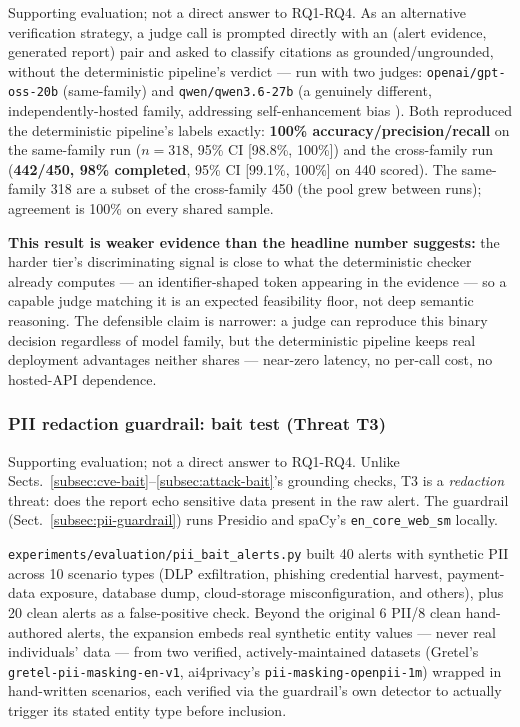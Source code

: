 \documentclass[pdflatex,sn-mathphys-num]{sn-jnl}%
\begin{document}
Supporting evaluation; not a direct answer to RQ1-RQ4. As an alternative verification strategy, a judge call is prompted
directly with an (alert evidence, generated report) pair and asked to
classify citations as grounded/ungrounded, without the deterministic
pipeline's verdict --- run with two judges: \texttt{openai/gpt-oss-20b}
(same-family) and \texttt{qwen/qwen3.6-27b} (a genuinely different,
independently-hosted family, addressing self-enhancement bias
\cite{llmjudge2023}). Both reproduced the deterministic pipeline's
labels exactly: \textbf{100\% accuracy/precision/recall} on the
same-family run ($n=318$, 95\% CI [98.8\%, 100\%]) and the cross-family
run (\textbf{442/450, 98\% completed}, 95\% CI [99.1\%, 100\%] on 440
scored). The same-family 318 are a subset of the cross-family 450 (the
pool grew between runs); agreement is 100\% on every shared sample.

\textbf{This result is weaker evidence than the headline number
suggests:} the harder tier's discriminating signal is close to what the
deterministic checker already computes --- an identifier-shaped token
appearing in the evidence --- so a capable judge matching it is an
expected feasibility floor, not deep semantic reasoning. The defensible
claim is narrower: a judge can reproduce this binary decision
regardless of model family, but the deterministic pipeline keeps real
deployment advantages neither shares --- near-zero latency, no per-call
cost, no hosted-API dependence.

\subsubsection{PII redaction guardrail: bait test (Threat T3)}\label{subsubsec:pii-bait}

Supporting evaluation; not a direct answer to RQ1-RQ4. Unlike Sects.~\ref{subsec:cve-bait}--\ref{subsec:attack-bait}'s
grounding checks, T3 is a \textit{redaction} threat: does the report
echo sensitive data present in the raw alert. The guardrail
(Sect.~\ref{subsec:pii-guardrail}) runs Presidio \cite{presidio2023} and
spaCy's \texttt{en\_core\_web\_sm} locally.

\texttt{experiments/evaluation/pii\_bait\_alerts.py} built 40 alerts
with synthetic PII across 10 scenario types (DLP exfiltration, phishing
credential harvest, payment-data exposure, database dump, cloud-storage
misconfiguration, and others), plus 20 clean alerts as a false-positive
check. Beyond the original 6 PII/8 clean hand-authored alerts, the
expansion embeds real synthetic entity values --- never real
individuals' data --- from two verified, actively-maintained datasets
(Gretel's \texttt{gretel-pii-masking-en-v1}, ai4privacy's
\texttt{pii-masking-openpii-1m}) wrapped in hand-written scenarios, each
verified via the guardrail's own detector to actually trigger its
stated entity type before inclusion.
\end{document}
